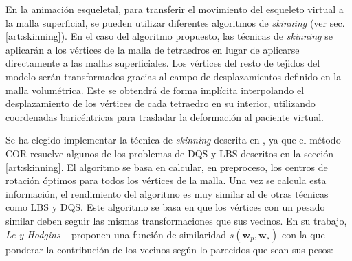 En la animación esqueletal, para transferir el movimiento del esqueleto virtual a la malla superficial, se pueden utilizar diferentes algoritmos de \emph{skinning} (ver sec. \ref{art:skinning}). %
En el caso del algoritmo propuesto, las técnicas de  \emph{skinning} se aplicarán a los vértices de la malla de tetraedros en lugar de aplicarse directamente a las mallas superficiales. Los vértices del resto de tejidos del modelo serán transformados gracias al campo de desplazamientos definido en la malla volumétrica. Este se obtendrá de forma implícita interpolando el desplazamiento de los vértices de cada tetraedro en su interior, utilizando coordenadas baricéntricas para trasladar la deformación al paciente virtual. 



Se ha elegido implementar la técnica de \emph{skinning} descrita en \cite{le2016real},  ya que el método \ac{COR} resuelve algunos de los problemas de \ac{DQS} y \ac{LBS} descritos en la sección \ref{art:skinning}. El algoritmo se basa en calcular, en preproceso, los centros de rotación óptimos para todos los vértices de la malla. %
Una vez se calcula esta información, el rendimiento del algoritmo es muy similar al de otras técnicas como \ac{LBS} y \ac{DQS}. %
Este algoritmo se basa en que los vértices con un pesado similar deben seguir las mismas transformaciones que sus vecinos. En su trabajo, \emph {Le y Hodgins} ~\cite{le2016real} proponen una función de similaridad  $s(\textbf{w}_p,\textbf{w}_s)$ con la que ponderar la contribución de los vecinos según lo parecidos que sean sus pesos:

